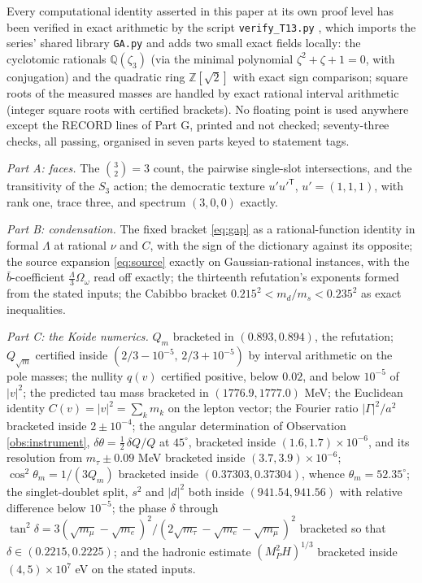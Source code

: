 \documentclass[11pt]{article}
\theoremstyle{definition}
\begin{document}
Every computational identity asserted in this paper at its own proof level has been verified in exact arithmetic by the script \texttt{verify\_T13.py} \cite{ButlerVerifyT13}, which imports the series' shared library \texttt{GA.py} and adds two small exact fields locally: the cyclotomic rationals $\mathbb{Q}(\zeta_{3})$ (via the minimal polynomial $\zeta^{2} + \zeta + 1 = 0$, with conjugation) and the quadratic ring $\mathbb{Z}[\sqrt{2}]$ with exact sign comparison; square roots of the measured masses are handled by exact rational interval arithmetic (integer square roots with certified brackets). No floating point is used anywhere except the RECORD lines of Part G, printed and not checked; seventy-three checks, all passing, organised in seven parts keyed to statement tags.

\emph{Part A: faces.} The $\binom{3}{2} = 3$ count, the pairwise single-slot intersections, and the transitivity of the $S_{3}$ action; the democratic texture $u'u'^{\mathsf{T}}$, $u' = (1,1,1)$, with rank one, trace three, and spectrum $(3, 0, 0)$ exactly.

\emph{Part B: condensation.} The fixed bracket \eqref{eq:gap} as a rational-function identity in formal $\Lambda$ at rational $\nu$ and $C$, with the sign of the dictionary against its opposite; the source expansion \eqref{eq:source} exactly on Gaussian-rational instances, with the $\bar b$-coefficient $\tfrac{\Lambda}{3}\Omega_{\omega}$ read off exactly; the thirteenth refutation's exponents formed from the stated inputs; the Cabibbo bracket $0.215^{2} < m_{d}/m_{s} < 0.235^{2}$ as exact inequalities.

\emph{Part C: the Koide numerics.} $Q_{m}$ bracketed in $(0.893, 0.894)$, the refutation; $Q_{\sqrt{m}}$ certified inside $(2/3 - 10^{-5},\, 2/3 + 10^{-5})$ by interval arithmetic on the pole masses; the nullity $q(v)$ certified positive, below $0.02$, and below $10^{-5}$ of $|v|^{2}$; the predicted tau mass bracketed in $(1776.9, 1777.0)$ MeV; the Euclidean identity $C(v) = |v|^{2} = \sum_{k}m_{k}$ on the lepton vector; the Fourier ratio $|\Gamma|^{2}/a^{2}$ bracketed inside $2 \pm 10^{-4}$; the angular determination of Observation \ref{obs:instrument}, $\delta\theta = \tfrac12\,\delta Q/Q$ at $45^{\circ}$, bracketed inside $(1.6, 1.7) \times 10^{-6}$, and its resolution from $m_{\tau} \pm 0.09$ MeV bracketed inside $(3.7, 3.9) \times 10^{-6}$; $\cos^{2}\theta_{m} = 1/(3Q_{m})$ bracketed inside $(0.37303, 0.37304)$, whence $\theta_{m} = 52.35^{\circ}$; the singlet-doublet split, $s^{2}$ and $|d|^{2}$ both inside $(941.54, 941.56)$ with relative difference below $10^{-5}$; the phase $\delta$ through $\tan^{2}\delta = 3(\sqrt{m_{\mu}} - \sqrt{m_{e}})^{2}/(2\sqrt{m_{\tau}} - \sqrt{m_{e}} - \sqrt{m_{\mu}})^{2}$ bracketed so that $\delta \in (0.2215, 0.2225)$; and the hadronic estimate $(M_{P}^{2}H)^{1/3}$ bracketed inside $(4, 5) \times 10^{7}$ eV on the stated inputs.
\end{document}
